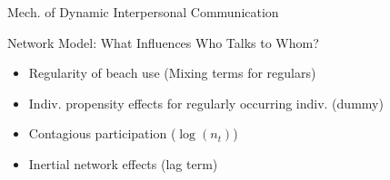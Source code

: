 \documentclass[10pt]{beamer}
\begin{document}
\begin{frame}{Mech. of Dynamic Interpersonal Communication}
\begin{block}{Network Model: What Influences Who Talks to Whom?}
\begin{itemize}
\item<1-8> Regularity of beach use (Mixing terms for regulars)
\item<1-8> Indiv. propensity effects for regularly occurring indiv. (dummy) 

\item<1-8> Contagious participation ($\log(n_t)$)


\item<1-8> Inertial network effects (lag term)


\end{itemize}
\end{block}
\end{frame}
\end{document}
